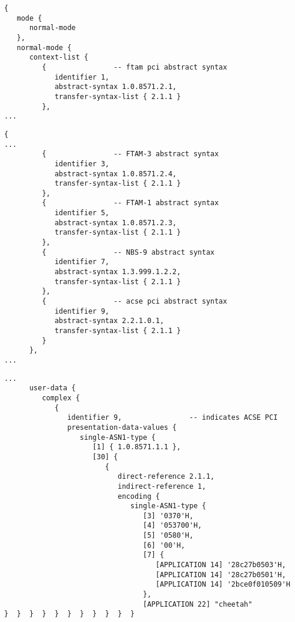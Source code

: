 \begin{bwslide}

\scriptsize
\begin{verbatim}
{
   mode {
      normal-mode
   },
   normal-mode {
      context-list {
         {                -- ftam pci abstract syntax
            identifier 1,
            abstract-syntax 1.0.8571.2.1,
            transfer-syntax-list { 2.1.1 }
         },
...
\end{verbatim}
\end{bwslide}


\begin{bwslide}

\scriptsize
\begin{verbatim}
{
...
         {                -- FTAM-3 abstract syntax
            identifier 3,
            abstract-syntax 1.0.8571.2.4,
            transfer-syntax-list { 2.1.1 }
         },
         {                -- FTAM-1 abstract syntax
            identifier 5,
            abstract-syntax 1.0.8571.2.3,
            transfer-syntax-list { 2.1.1 }
         },
         {                -- NBS-9 abstract syntax
            identifier 7,
            abstract-syntax 1.3.999.1.2.2,
            transfer-syntax-list { 2.1.1 }
         },
         {                -- acse pci abstract syntax
            identifier 9,
            abstract-syntax 2.2.1.0.1,
            transfer-syntax-list { 2.1.1 }
         }
      },
...
\end{verbatim}
\end{bwslide}


\begin{bwslide}

\scriptsize
\begin{verbatim}
...
      user-data {
         complex {
            {
               identifier 9,                -- indicates ACSE PCI
               presentation-data-values {
                  single-ASN1-type {
                     [1] { 1.0.8571.1.1 },
                     [30] {
                        {
                           direct-reference 2.1.1,
                           indirect-reference 1,
                           encoding {
                              single-ASN1-type {
                                 [3] '0370'H,
                                 [4] '053700'H,
                                 [5] '0580'H,
                                 [6] '00'H,
                                 [7] {
                                    [APPLICATION 14] '28c27b0503'H,
                                    [APPLICATION 14] '28c27b0501'H,
                                    [APPLICATION 14] '2bce0f010509'H
                                 },
                                 [APPLICATION 22] "cheetah"
}  }  }  }  }  }  }  }  }  }  }
\end{verbatim}
\end{bwslide}


